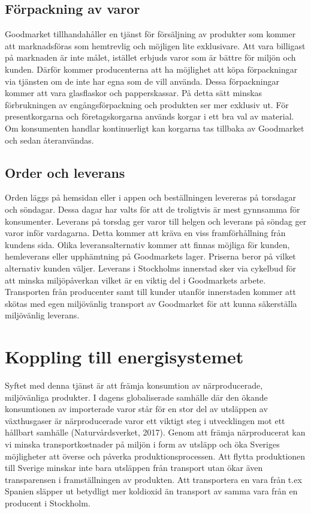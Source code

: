 \documentclass[10pt,a4paper,oneside]{article}
\begin{document}
\subsection{Förpackning av varor}
Goodmarket tillhandahåller en tjänst för försäljning av produkter som kommer att marknadsföras som hemtrevlig och möjligen lite exklusivare. Att vara billigast på marknaden är inte målet, istället erbjuds varor som är bättre för miljön och kunden. Därför kommer producenterna att ha möjlighet att köpa förpackningar via tjänsten om de inte har egna som de vill använda. Dessa förpackningar kommer att vara glasflaskor och papperskassar. På detta sätt minskas förbrukningen av engångsförpackning och produkten ser mer exklusiv ut. För presentkorgarna och företagskorgarna används korgar i ett bra val av material. Om konsumenten handlar kontinuerligt kan korgarna tas tillbaka av Goodmarket och sedan återanvändas. 

\subsection{Order och leverans}
Orden läggs på hemsidan eller i appen och beställningen levereras på torsdagar och söndagar. Dessa dagar har valts för att de troligtvis är mest gynnsamma för konsumenter. Leverans på torsdag ger varor till helgen och leverans på söndag ger varor inför vardagarna. Detta kommer att kräva en viss framförhållning från kundens sida. Olika leveransalternativ kommer att finnas möjliga för kunden, hemleverans eller upphämtning på Goodmarkets lager. Priserna beror på vilket alternativ kunden väljer. Leverans i Stockholms innerstad sker via cykelbud för att minska miljöpåverkan vilket är en viktig del i Goodmarkets arbete. Transporten från producenter samt till kunder utanför innerstaden kommer att skötas med egen miljövänlig transport av Goodmarket för att kunna säkerställa miljövänlig leverans. 
\newpage

\section{Koppling till energisystemet}

Syftet med denna tjänst är att främja konsumtion av närproducerade, miljövänliga produkter.  I dagens globaliserade samhälle där den ökande konsumtionen av importerade varor står för en stor del av utsläppen av växthusgaser är närproducerade varor ett viktigt steg i utvecklingen mot ett hållbart samhälle (Naturvårdsverket, 2017). Genom att främja närproducerat kan vi minska transportkostnader på miljön i form av utsläpp och öka Sveriges möjligheter att överse och påverka produktionsprocessen. Att flytta produktionen till Sverige minskar inte bara utsläppen från transport utan ökar även transparensen i framställningen av produkten. Att transportera en vara från t.ex Spanien släpper ut betydligt mer koldioxid än transport av samma vara från en producent i Stockholm. \\  
\end{document}
